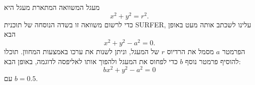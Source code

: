 \begin{surferPage}[המעגל]{מעגל}
המשוואה המתארת מעגל היא
\[x^2+y^2=r^2.\]
כדי לרשום משוואה זו בשדה הנוסחה של תוכנית SURFER, עלינו לשכתב אותה מעט באופן הבא
\[x^2+y^2-a^2=0.\]
הפרמטר $a$ מסמל את הרדיוס $r$ של המעגל, וניתן לשנות את ערכו באמצעות המחוון. תוכלו להוסיף פרמטר נוסף $b$ כדי לפחוס את המעגל ולהפוך אותו לאליפסה לדוגמה, באופן הבא:
\[bx^2+y^2-a^2=0\] עם $b=0.5$.
\end{surferPage}
